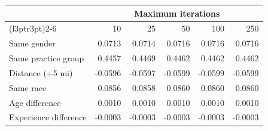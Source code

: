 
\begin{tabular}{lrrrrr}
\toprule
\multicolumn{1}{c}{ } & \multicolumn{5}{c}{Maximum iterations} \\
\cmidrule(l{3pt}r{3pt}){2-6}
 & 10 & 25 & 50 & 100 & 250\\
\midrule
\hspace{1em}Same gender & 0.0713 & 0.0714 & 0.0716 & 0.0716 & 0.0716\\
\hspace{1em}Same practice group & 0.4457 & 0.4469 & 0.4462 & 0.4462 & 0.4462\\
\hspace{1em}Distance (+5 mi) & -0.0596 & -0.0597 & -0.0599 & -0.0599 & -0.0599\\
\hspace{1em}Same race & 0.0856 & 0.0858 & 0.0860 & 0.0860 & 0.0860\\
\hspace{1em}Age difference & 0.0010 & 0.0010 & 0.0010 & 0.0010 & 0.0010\\
\hspace{1em}Experience difference & -0.0003 & -0.0003 & -0.0003 & -0.0003 & -0.0003\\
\bottomrule
\end{tabular}
